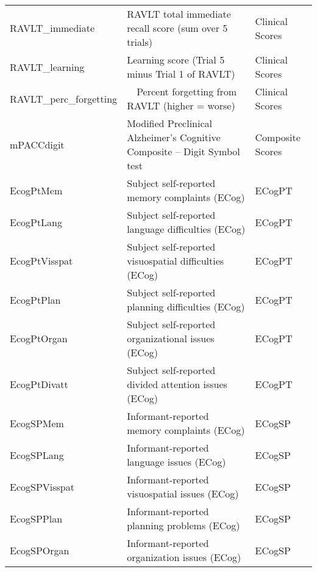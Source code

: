 \begin{table}[H]
\begin{adjustbox}{max width=\textwidth}
\begin{tabularx}{\textwidth}{>{\raggedright\arraybackslash}p{3cm} >{\raggedright\arraybackslash}X >{\raggedright\arraybackslash}p{3cm}}
			RAVLT\_immediate       & RAVLT total immediate recall score (sum over 5 trials)                             & Clinical Scores       \\
			RAVLT\_learning        & Learning score (Trial 5 minus Trial 1 of RAVLT)                                    & Clinical Scores       \\
			RAVLT\_perc\_forgetting & ~~Percent forgetting from RAVLT (higher = worse)                                     & Clinical Scores       \\
			mPACCdigit            & Modified Preclinical Alzheimer’s Cognitive Composite – Digit Symbol test           & Composite Scores      \\
			EcogPtMem             & Subject self-reported memory complaints (ECog)                                     & ECogPT                \\
			EcogPtLang            & Subject self-reported language difficulties (ECog)                                 & ECogPT                \\
			EcogPtVisspat         & Subject self-reported visuospatial difficulties (ECog)                             & ECogPT                \\
			EcogPtPlan            & Subject self-reported planning difficulties (ECog)                                 & ECogPT                \\
			EcogPtOrgan           & Subject self-reported organizational issues (ECog)                                 & ECogPT                \\
			EcogPtDivatt          & Subject self-reported divided attention issues (ECog)                              & ECogPT                \\
			EcogSPMem             & Informant-reported memory complaints (ECog)                                        & ECogSP                \\
			EcogSPLang            & Informant-reported language issues (ECog)                                          & ECogSP                \\
			EcogSPVisspat         & Informant-reported visuospatial issues (ECog)                                      & ECogSP                \\
			EcogSPPlan            & Informant-reported planning problems (ECog)                                        & ECogSP                \\
			EcogSPOrgan           & Informant-reported organization issues (ECog)                                      & ECogSP                \\

\end{tabularx}
\end{adjustbox}
\end{table}
